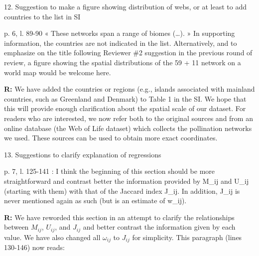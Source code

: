 \documentclass[12pt]{letter}
\newenvironment{refquote}{\bigskip \begin{it}}{\end{it}\smallskip}
\begin{document}
	12. Suggestion to make a figure showing distribution of webs, or at least to add countries to the list in SI


		\begin{refquote}
			p. 6, l. 89-90 « These networks span a range of biomes (…). » In supporting information, the countries are not indicated in the list. Alternatively, and to emphasize on the title following Reviewer \#2 suggestion in the previous round of review, a figure showing the spatial distributions of the 59 + 11 network on a world map would be welcome here.
		\end{refquote}


		\textbf{R:} We have added the countries or regions (e.g., islands associated with mainland countries, such as Greenland and Denmark) to Table 1 in the SI. We hope that this will provide enough clarification about the spatial scale of our dataset. For readers who are interested, we now refer both to the original sources and from an online database (the Web of Life dataset) which collects the pollination networks we used. These sources can be used to obtain more exact coordinates. 


	13. Suggestions to clarify explanation of regressions 

		\begin{refquote}
			p. 7, l. 125-141 : I think the beginning of this section should be more straightforward and contrast better the information provided by M\_ij and U\_ij (starting with them) with that of the Jaccard index J\_ij. In addition, J\_ij is never mentioned again as such (but is an estimate of w\_ij).
		\end{refquote}


		\textbf{R:} We have reworded this section in an attempt to clarify the relationships between $M_{ij}$, $U_{ij}$, and $J_{ij}$ and better contrast the information given by each value. We have also changed all $\omega_{ij}$ to $J_{ij}$ for simplicity. This paragraph (lines 130-146) now reads:
\end{document}
